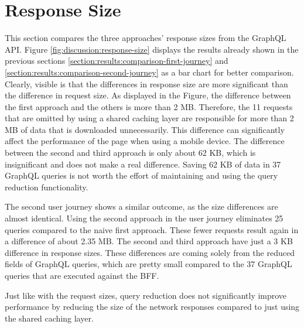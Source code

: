 \section{Response Size}\label{section:discussion:response-size}

This section compares the three approaches' response sizes from the GraphQL \ac{API}. Figure \ref{fig:discussion:response-size} displays the results already shown in the previous sections \ref{section:results:comparison-first-journey} and \ref{section:results:comparison-second-journey} as a bar chart for better comparison. Clearly, visible is that the differences in response size are more significant than the difference in request size. As displayed in the Figure, the difference between the first approach and the others is more than 2 MB. Therefore, the 11 requests that are omitted by using a shared caching layer are responsible for more than 2 MB of data that is downloaded unnecessarily. This difference can significantly affect the performance of the page when using a mobile device. The difference between the second and third approach is only about 62 KB, which is insignificant and does not make a real difference. Saving 62 KB of data in 37 GraphQL queries is not worth the effort of maintaining and using the query reduction functionality. 

\bigskip

\noindent The second user journey shows a similar outcome, as the size differences are almost identical. Using the second approach in the user journey eliminates 25 queries compared to the naive first approach. These fewer requests result again in a difference of about 2.35 MB. The second and third approach have just a 3 KB difference in response sizes. These differences are coming solely from the reduced fields of GraphQL queries, which are pretty small compared to the 37 GraphQL queries that are executed against the \ac{BFF}.

\bigskip

\noindent Just like with the request sizes, query reduction does not significantly improve performance by reducing the size of the network responses compared to just using the shared caching layer.


